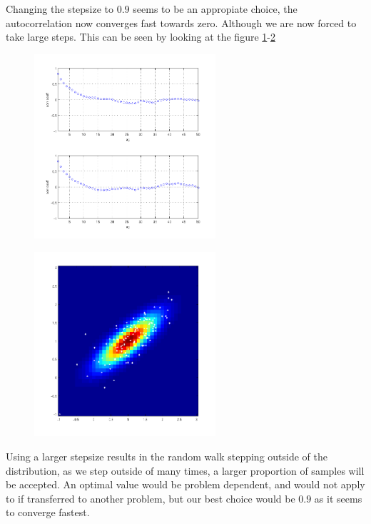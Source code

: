 \documentclass[a4paper, 10pt, final]{article}
\begin{document}
Changing the stepsize to $0.9$ seems to be an appropiate choice, the autocorrelation now converges fast towards zero. Although we are now forced to take large steps. This can be seen by looking at the figure \ref{fig:q1_7e}-\ref{fig:q1_7f}


\begin{figure}[!htpb]
  \centering
  \includegraphics[width=0.6\textwidth]{images/q1_7e}
  \caption{}
  \label{fig:q1_7e}
\end{figure}

\begin{figure}[!htpb]
  \centering
  \includegraphics[width=0.6\textwidth]{images/q1_7f}
  \caption{}
  \label{fig:q1_7f}
\end{figure}

Using a larger stepsize results in the random walk stepping outside of the distribution, as we step outside of many times, a larger proportion of samples will be accepted.
An optimal value would be problem dependent, and would not apply to if transferred to another problem, but our best choice would be $0.9$ as it seems to converge fastest.
\end{document}
